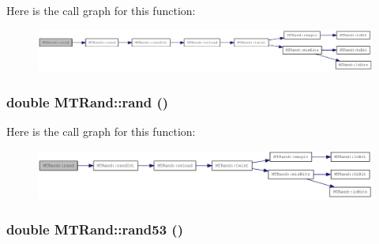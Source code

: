 Here is the call graph for this function:\nopagebreak
\begin{figure}[H]
\begin{center}
\leavevmode
\includegraphics[width=420pt]{classMTRand_aa4fe82fc27fd81414ce7554093a9766b_cgraph}
\end{center}
\end{figure}
\hypertarget{classMTRand_a76d129a2d850c24ff4a0613f299cf3a5}{
\subsubsection[{rand}]{\setlength{\rightskip}{0pt plus 5cm}double MTRand::rand ()}}
\label{classMTRand_a76d129a2d850c24ff4a0613f299cf3a5}


Here is the call graph for this function:\nopagebreak
\begin{figure}[H]
\begin{center}
\leavevmode
\includegraphics[width=399pt]{classMTRand_a76d129a2d850c24ff4a0613f299cf3a5_cgraph}
\end{center}
\end{figure}
\hypertarget{classMTRand_a15f4daf79febbe4ff43c3e6ce2c4fcbe}{
\subsubsection[{rand53}]{\setlength{\rightskip}{0pt plus 5cm}double MTRand::rand53 ()}}
\label{classMTRand_a15f4daf79febbe4ff43c3e6ce2c4fcbe}



